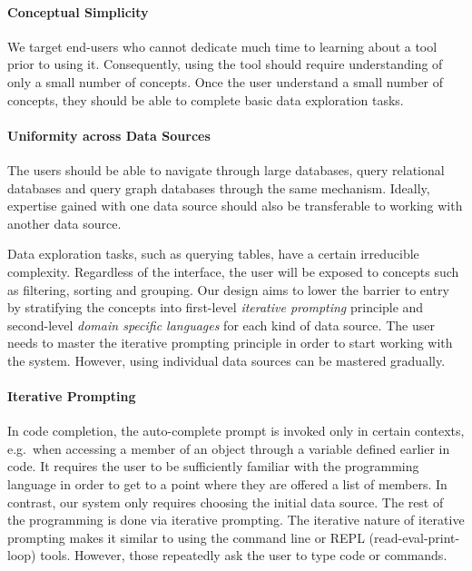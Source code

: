 \documentclass[manuscript,review,anonymous]{acmart}
\begin{document}
\paragraph{Conceptual Simplicity}
We target end-users who cannot dedicate much time to learning about a tool prior
to using it. Consequently, using the tool should require understanding of only a small number
of concepts. Once the user understand a small number of concepts, they should be able to complete
basic data exploration tasks.

\paragraph{Uniformity across Data Sources}
The users should be able to navigate through large databases, query relational databases and
query graph databases through the same mechanism. Ideally, expertise gained with one data source
should also be transferable to working with another data source.

Data exploration tasks, such as querying tables, have a certain irreducible complexity.
Regardless of the interface, the user will be exposed to concepts such as filtering,
sorting and grouping. Our design aims to lower the barrier to entry by stratifying the concepts
into first-level \emph{iterative prompting} principle and second-level \emph{domain specific
languages} for each kind of data source.
The user needs to master the iterative prompting principle in order to start working
with the system. However, using individual data sources can be mastered gradually.

\paragraph{Iterative Prompting}

In code completion, the auto-complete
prompt is invoked only in certain contexts, e.g.~when accessing a member of an object through a
variable defined earlier in code. It requires the user to be sufficiently familiar with the
programming language in order to get to a point where they are offered a list of members. In
contrast, our system only requires choosing the initial data source. The rest of the programming
is done via iterative prompting. The iterative nature of iterative prompting makes it similar to
using the command line or REPL (read-eval-print-loop) tools. However, those repeatedly ask the
user to type code or commands.
\end{document}
